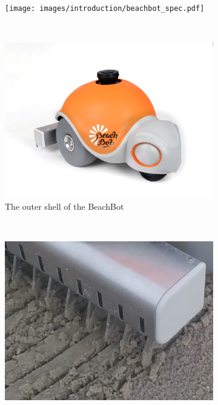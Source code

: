 \begin{figure}
\centering
\begin{subfigure}[c]{1\textwidth}
\texttt{[image: images/introduction/beachbot\_spec.pdf]} 
\end{subfigure}
\\
\begin{subfigure}[c]{1\textwidth}
\includegraphics[width=\textwidth]{images/introduction/final_shell_scaled_down.jpg} 
\caption{The outer shell of the BeachBot}
\end{subfigure}
\\
\vspace{2cm}
\begin{subfigure}[c]{0.46\textwidth}
\includegraphics[width=\textwidth]{images/introduction/localization_precision.png} 

\end{subfigure}
\end{figure}
